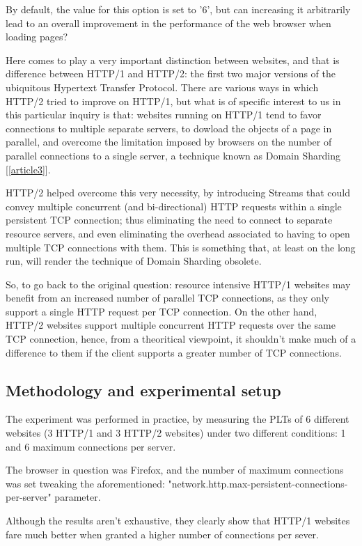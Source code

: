 \documentclass[a4paper,10pt]{article}
\begin{document}
By default, the value for this option is set to '6', but can increasing it arbitrarily lead to an overall improvement in the performance of the web browser when loading pages? 

Here comes to play a very important distinction between websites, and that is difference between HTTP/1 and HTTP/2: the first two major versions of the ubiquitous Hypertext Transfer Protocol. There are various ways in which HTTP/2 tried to improve on HTTP/1, but what is of specific interest to us in this particular inquiry is that: websites running on HTTP/1 tend to favor connections to multiple separate servers, to dowload the objects of a page in parallel, and overcome the limitation imposed by browsers on the number of parallel connections to a single server, a technique known as Domain Sharding [\ref{article3}]. 

HTTP/2 helped overcome this very necessity, by introducing Streams that could convey multiple
concurrent (and bi-directional) HTTP requests within a single persistent TCP connection; thus eliminating the need to connect to separate resource servers, and even eliminating the overhead associated to having to open multiple TCP connections with them. This is something that, at least on the long run, will render the technique of Domain Sharding obsolete.

So, to go back to the original question: resource intensive HTTP/1 websites may benefit from an increased number of parallel TCP connections, as they only support a single HTTP request per TCP connection. On the other hand, HTTP/2 websites support multiple concurrent HTTP requests over the same TCP connection, hence, from a theoritical viewpoint, it shouldn't make much of a difference to them if the client supports a greater number of TCP connections.


\subsection{Methodology and experimental setup}

The experiment was performed in practice, by measuring the PLTs of 6 different websites (3 HTTP/1 and 3 HTTP/2 websites) under two different conditions: 1 and 6 maximum connections per server.

The browser in question was Firefox, and the number of maximum connections was set tweaking the aforementioned: "network.http.max-persistent-connections-per-server" parameter.

Although the results aren't exhaustive, they clearly show that HTTP/1 websites fare much better when granted a higher number of connections per sever.
\end{document}

